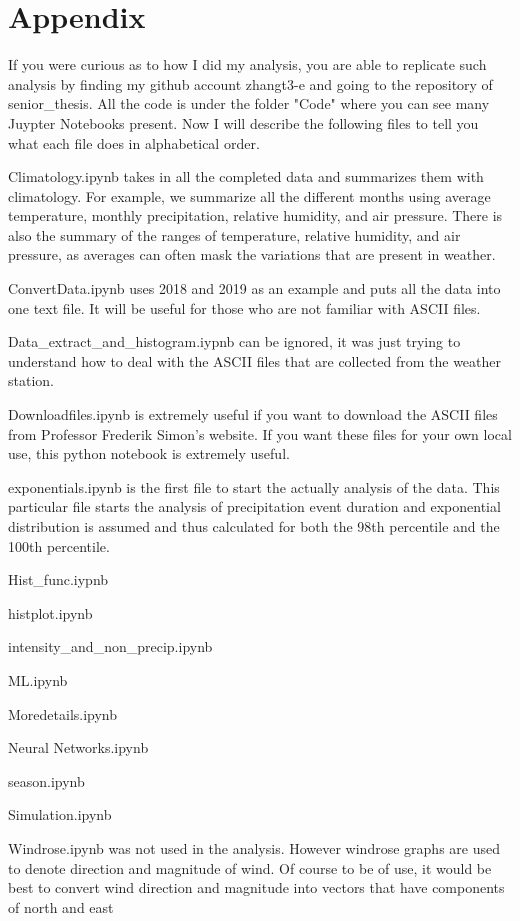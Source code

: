 \documentclass[11pt]{report}
\begin{document}
\clearpage
\section{Appendix} 
If you were curious as to how I did my analysis, you are able to replicate such analysis by finding my github account zhangt3-e and going to the repository of senior\_thesis. All the code is under the folder "Code" where you can see many Juypter Notebooks present. Now I will describe the following files to tell you what each file does in alphabetical order. 

Climatology.ipynb takes in all the completed data and summarizes them with climatology. For example, we summarize all the different months using average temperature, monthly precipitation, relative humidity, and air pressure. There is also the summary of the ranges of temperature, relative humidity, and air pressure, as averages can often mask the variations that are present in weather. 

ConvertData.ipynb uses 2018 and 2019 as an example and puts all the data into one text file. It will be useful for those who are not familiar with ASCII files. 

Data\_extract\_and\_histogram.iypnb can be ignored, it was just trying to understand how to deal with the ASCII files that are collected from the weather station. 

Downloadfiles.ipynb is extremely useful if you want to download the ASCII files from Professor Frederik Simon's website. If you want these files for your own local use, this python notebook is extremely useful. 

exponentials.ipynb is the first file to start the actually analysis of the data. This particular file starts the analysis of precipitation event duration and exponential distribution is assumed and thus calculated for both the 98th percentile and the 100th percentile. 

Hist\_func.iypnb 

histplot.ipynb 

intensity\_and\_non\_precip.ipynb 

ML.ipynb 

Moredetails.ipynb 

Neural Networks.ipynb 

season.ipynb 

Simulation.ipynb 

Windrose.ipynb was not used in the analysis. However windrose graphs are used to denote direction and magnitude of wind. Of course to be of use, it would be best to convert wind direction and magnitude into vectors that have components of north and east 
\end{document}
